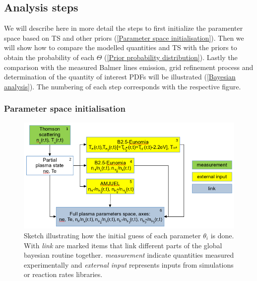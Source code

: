 \subsection{Analysis steps}\label{Analysis steps}

We will describe here in more detail the steps to first initialize the paramenter space based on TS and other priors (\autoref{Parameter space initialisation}). Then we will show how to compare the modelled quantities and TS with the priors to  obtain the probability of each $\Theta$ (\autoref{Prior probability distribution}). Lastly the comparison with the measured Balmer lines emission, grid refinement process and determination of the quantity of interest PDFs will be illustrated (\autoref{Bayesian analysis}). The numbering of each step corresponds with the respective figure.

\subsubsection{Parameter space initialisation}\label{Parameter space initialisation}

\begin{figure}
	\centering
	\includegraphics[scale=0.29,trim={0 0 0 0},clip]{Chapters/chapter3/figs/bayesian_steps10.png}
	\caption{Sketch illustrating how the initial guess of each parameter $\theta_i$ is done. With \emph{link} are marked items that link different parts of the global bayesian routine together. \emph{measurement} indicate quantities measured experimentally and \emph{external input} represents inputs from simulations or reaction rates libraries.}
	\label{fig:bayes1a}
\end{figure}


